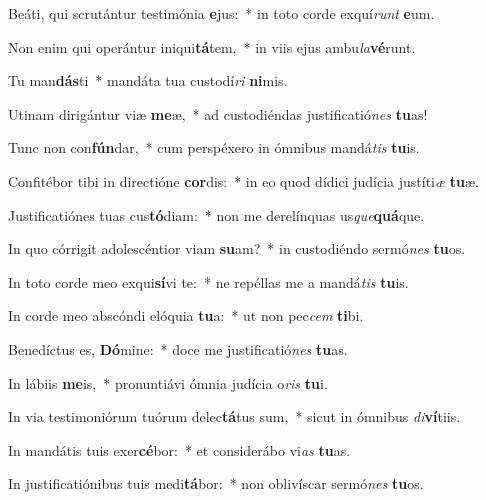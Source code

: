 \item Beáti, qui scrutántur testimónia \textbf{e}jus:~* in toto corde exquí\textit{runt} \textbf{e}um.
\item Non enim qui operántur iniqui\textbf{tá}tem,~* in viis ejus ambu\textit{la}\textbf{vé}runt.
\item Tu man\textbf{dás}ti~* mandáta tua custodí\textit{ri} \textbf{ni}mis.
\item Utinam dirigántur viæ \textbf{me}æ,~* ad custodiéndas justificatió\textit{nes} \textbf{tu}as!
\item Tunc non con\textbf{fún}dar,~* cum perspéxero in ómnibus mandá\textit{tis} \textbf{tu}is.
\item Confitébor tibi in directióne \textbf{cor}dis:~* in eo quod dídici judícia justíti\textit{æ} \textbf{tu}æ.
\item Justificatiónes tuas cus\textbf{tó}diam:~* non me derelínquas us\textit{que}\textbf{quá}que.
\item In quo córrigit adolescéntior viam \textbf{su}am?~* in custodiéndo sermó\textit{nes} \textbf{tu}os.
\item In toto corde meo exqui\textbf{sí}vi te:~* ne repéllas me a mandá\textit{tis} \textbf{tu}is.
\item In corde meo abscóndi elóquia \textbf{tu}a:~* ut non pec\textit{cem} \textbf{ti}bi.
\item Benedíctus es, \textbf{Dó}mine:~* doce me justificatió\textit{nes} \textbf{tu}as.
\item In lábiis \textbf{me}is,~* pronuntiávi ómnia judícia o\textit{ris} \textbf{tu}i.
\item In via testimoniórum tuórum delec\textbf{tá}tus sum,~* sicut in ómnibus \textit{di}\textbf{ví}tiis.
\item In mandátis tuis exer\textbf{cé}bor:~* et considerábo vi\textit{as} \textbf{tu}as.
\item In justificatiónibus tuis medi\textbf{tá}bor:~* non oblivíscar sermó\textit{nes} \textbf{tu}os.
